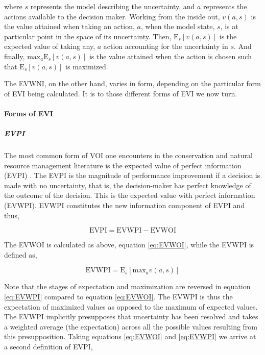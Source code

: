 \documentclass[]{article}
\theoremstyle{definition}
\theoremstyle{definition}
\theoremstyle{definition}
\theoremstyle{remark}
\begin{document}
where \(s\) represents the model describing the uncertainty, and \(a\)
represents the actions available to the decision maker. Working from the
inside out, \(v(a,s)\) is the value attained when taking an action,
\(a\), when the model state, \(s\), is at particular point in the space
of its uncertainty. Then, \(\mathrm{E}_s[{v(a, s)}]\) is the expected
value of taking any, \(a\) action accounting for the uncertainty in
\(s\). And finally, \(\mathrm{max}_a\mathrm{E}_s[{v(a, s)}]\) is the
value attained when the action is chosen such that
\(\mathrm{E}_s[{v(a, s)}]\) is maximized.

The EVWNI, on the other hand, varies in form, depending on the
particular form of EVI being calculated. It is to those different forms
of EVI we now turn.

\paragraph*{Forms of EVI}\label{forms-of-evi}

\subparagraph*{EVPI}\label{evpi}

The most common form of VOI one encounters in the conservation and
natural resource management literature is the expected value of perfect
information (EVPI) \citep[e.g.,][]{Kuikka1999, Moore2011}. The EVPI is
the magnitude of performance improvement if a decision is made with no
uncertainty, that is, the decision-maker has perfect knowledge of the
outcome of the decision. This is the expected value with perfect
information (EVWPI). EVWPI constitutes the new information component of
EVPI and thus,

\begin{equation}
\mathrm{EVPI} = \mathrm{EVWPI} - \mathrm{EVWOI}
\label{eq:EVPI1}
\end{equation}

The EVWOI is calculated as above, equation \eqref{eq:EVWOI}, while the
EVWPI is defined as,

\begin{equation}
\mathrm{EVWPI} = \mathrm{E}_s[\mathrm{max}_av(a, s)]
\label{eq:EVWPI}
\end{equation}

Note that the stages of expectation and maximization are reversed in
equation \eqref{eq:EVWPI} compared to equation \eqref{eq:EVWOI}. The EVWPI
is thus the expectation of maximized values as opposed to the maximum of
expected values. The EVWPI implicitly presupposes that uncertainty has
been resolved and takes a weighted average (the expectation) across all
the possible values resulting from this presupposition. Taking equations
\eqref{eq:EVWOI} and \eqref{eq:EVWPI} we arrive at a second definition of
EVPI,
\end{document}
